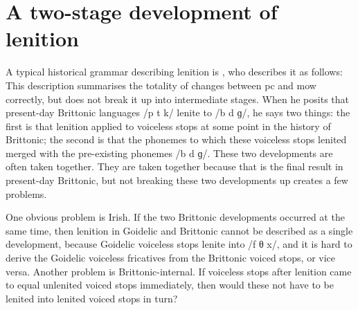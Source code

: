 \section{A two-stage development of lenition}
\label{sec:two-stage-devel}
A typical historical grammar describing lenition is \textcite{Mor_Welsh13}, who describes it as follows:
This description summarises the totality of changes between \gls{pc} and \gls{mow} correctly, but does not break it up into intermediate stages. 
When he posits that present-day Brittonic languages /p t k/ lenite to /b d ɡ/, he says two things: the first is that lenition applied to voiceless stops at some point in the history of Brittonic; the second is that the phonemes to which these voiceless stops lenited merged with the pre-existing phonemes /b d ɡ/. These two developments are often taken together. They are taken together because that is the final result in present-day Brittonic, but not breaking these two developments up creates a few problems.

One obvious problem is Irish. If the two Brittonic developments occurred at the same time, then lenition in Goidelic and Brittonic cannot be described as a single development, because Goidelic voiceless stops lenite into /f θ x/, and it is hard to derive the Goidelic  voiceless fricatives from the Brittonic voiced stops, or vice versa. Another problem is Brittonic-internal. If voiceless stops after lenition came to equal unlenited voiced stops immediately, then would these not have to be lenited into lenited voiced stops in turn? 

